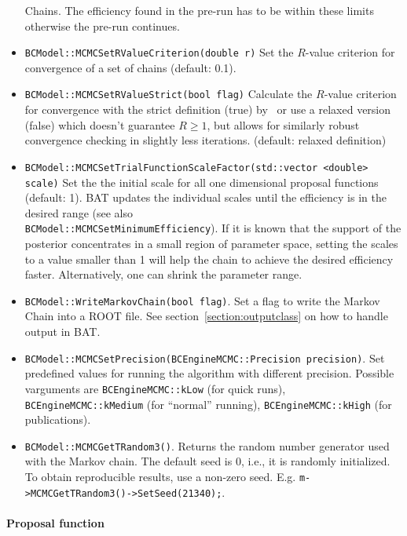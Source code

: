 \documentclass[11pt, a4paper]{article}
\begin{document}
\begin{itemize}
  Chains. The efficiency found in the pre-run has to be within these
  limits otherwise the pre-run continues.
\item \verb|BCModel::MCMCSetRValueCriterion(double r)| Set the
  $R$-value criterion for convergence of a set of chains (default:
  0.1).
\item \verb|BCModel::MCMCSetRValueStrict(bool flag)| Calculate the
  $R$-value criterion for convergence with the strict definition (true)
  by~\cite{R_value}  or use a relaxed version (false) which doesn't guarantee
  $R \ge 1$, but allows for similarly robust convergence checking in slightly
  less iterations. (default: relaxed definition)
\item \verb|BCModel::MCMCSetTrialFunctionScaleFactor(std::vector <double> scale)|
  Set the the initial scale for all one dimensional proposal functions (default: 1).
  BAT updates the individual scales until the efficiency is in the desired range
  (see also \\ \verb|BCModel::MCMCSetMinimumEfficiency|). If it is known that the 
  support of the posterior concentrates in a small region of parameter space, 
  setting the scales to a value smaller than 1 will help the chain to achieve 
  the desired efficiency faster. Alternatively, one can shrink the parameter range.
\item \verb|BCModel::WriteMarkovChain(bool flag)|. Set a flag to
 write the Markov Chain into a ROOT file. See
 section~\ref{section:outputclass} on how to handle output in BAT.
\item
  \verb|BCModel::MCMCSetPrecision(BCEngineMCMC::Precision precision)|. Set
  predefined values for running the algorithm with different
  precision. Possible varguments are \linebreak \verb|BCEngineMCMC::kLow| (for
  quick runs), \verb|BCEngineMCMC::kMedium| (for ``normal'' running),
  \linebreak \verb|BCEngineMCMC::kHigh| (for publications).
\item \verb|BCModel::MCMCGetTRandom3()|. Returns the random number
generator used with the Markov chain. The default seed is 0, i.e.,
it is randomly initialized. To obtain reproducible results, use
a non-zero seed. E.g.
\verb|m->MCMCGetTRandom3()->SetSeed(21340);|.
\end{itemize}

\paragraph{Proposal function}
\end{document}
